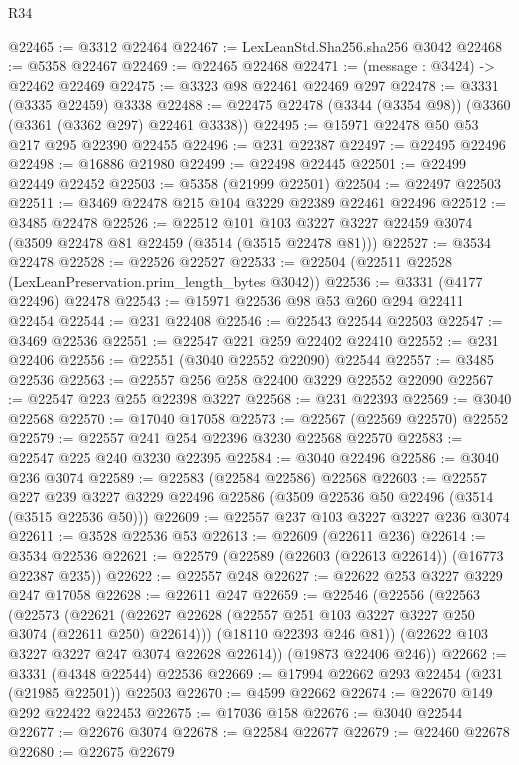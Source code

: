 \begin{lexlean}{R34}
\begin{coremodule}
@22465 := @3312 @22464
@22467 := LexLeanStd.Sha256.sha256 @3042
@22468 := @5358 @22467
@22469 := @22465 @22468
@22471 := (message : @3424) -> @22462 @22469
@22475 := @3323 @98 @22461 @22469 @297
@22478 := @3331 (@3335 @22459) @3338
@22488 := @22475 @22478 (@3344 (@3354 @98)) (@3360 (@3361 (@3362 @297) @22461 @3338))
@22495 := @15971 @22478 @50 @53 @217 @295 @22390 @22455
@22496 := @231 @22387
@22497 := @22495 @22496
@22498 := @16886 @21980
@22499 := @22498 @22445
@22501 := @22499 @22449 @22452
@22503 := @5358 (@21999 @22501)
@22504 := @22497 @22503
@22511 := @3469 @22478 @215 @104 @3229 @22389 @22461 @22496
@22512 := @3485 @22478
@22526 := @22512
    @101
    @103
    @3227
    @3227
    @22459
    @3074
    (@3509 @22478 @81 @22459 (@3514 (@3515 @22478 @81)))
@22527 := @3534 @22478
@22528 := @22526 @22527
@22533 := @22504 (@22511 @22528 (LexLeanPreservation.prim_length_bytes @3042))
@22536 := @3331 (@4177 @22496) @22478
@22543 := @15971 @22536 @98 @53 @260 @294 @22411 @22454
@22544 := @231 @22408
@22546 := @22543 @22544 @22503
@22547 := @3469 @22536
@22551 := @22547 @221 @259 @22402 @22410
@22552 := @231 @22406
@22556 := @22551 (@3040 @22552 @22090) @22544
@22557 := @3485 @22536
@22563 := @22557 @256 @258 @22400 @3229 @22552 @22090
@22567 := @22547 @223 @255 @22398 @3227
@22568 := @231 @22393
@22569 := @3040 @22568
@22570 := @17040 @17058
@22573 := @22567 (@22569 @22570) @22552
@22579 := @22557 @241 @254 @22396 @3230 @22568 @22570
@22583 := @22547 @225 @240 @3230 @22395
@22584 := @3040 @22496
@22586 := @3040 @236 @3074
@22589 := @22583 (@22584 @22586) @22568
@22603 := @22557
    @227
    @239
    @3227
    @3229
    @22496
    @22586
    (@3509 @22536 @50 @22496 (@3514 (@3515 @22536 @50)))
@22609 := @22557 @237 @103 @3227 @3227 @236 @3074
@22611 := @3528 @22536 @53
@22613 := @22609 (@22611 @236)
@22614 := @3534 @22536
@22621 := @22579 (@22589 (@22603 (@22613 @22614)) (@16773 @22387 @235))
@22622 := @22557 @248
@22627 := @22622 @253 @3227 @3229 @247 @17058
@22628 := @22611 @247
@22659 := @22546
    (@22556
      (@22563
        (@22573
          (@22621 (@22627 @22628 (@22557 @251 @103 @3227 @3227 @250 @3074 (@22611 @250) @22614)))
          (@18110 @22393 @246 @81))
        (@22622 @103 @3227 @3227 @247 @3074 @22628 @22614))
      (@19873 @22406 @246))
@22662 := @3331 (@4348 @22544) @22536
@22669 := @17994 @22662 @293 @22454 (@231 (@21985 @22501)) @22503
@22670 := @4599 @22662
@22674 := @22670 @149 @292 @22422 @22453
@22675 := @17036 @158
@22676 := @3040 @22544
@22677 := @22676 @3074
@22678 := @22584 @22677
@22679 := @22460 @22678
@22680 := @22675 @22679

\end{coremodule}
\end{lexlean}
